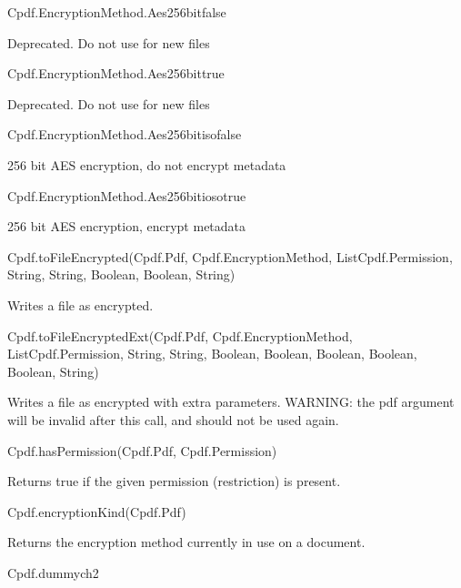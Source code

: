 Cpdf.EncryptionMethod.Aes256bitfalse

Deprecated. Do not use for new files

Cpdf.EncryptionMethod.Aes256bittrue

Deprecated. Do not use for new files

Cpdf.EncryptionMethod.Aes256bitisofalse

256 bit AES encryption, do not encrypt metadata

Cpdf.EncryptionMethod.Aes256bitiosotrue

256 bit AES encryption, encrypt metadata

Cpdf.toFileEncrypted(Cpdf.Pdf, Cpdf.EncryptionMethod, List{Cpdf.Permission}, String, String, Boolean, Boolean, String)

Writes a file as encrypted.

Cpdf.toFileEncryptedExt(Cpdf.Pdf, Cpdf.EncryptionMethod, List{Cpdf.Permission}, String, String, Boolean, Boolean, Boolean, Boolean, Boolean, String)

Writes a file as encrypted with extra parameters. WARNING: the
pdf argument will be invalid after this call, and should not be used again.

Cpdf.hasPermission(Cpdf.Pdf, Cpdf.Permission)

Returns true if the given permission
(restriction) is present.

Cpdf.encryptionKind(Cpdf.Pdf)

Returns the encryption method currently in use on
a document.

Cpdf.dummych2

